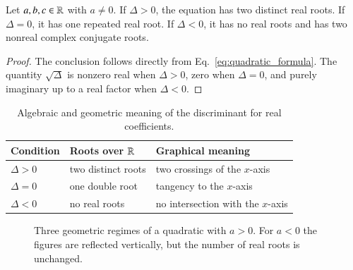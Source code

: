 \begin{proposition}
Let $a,b,c\in\mathbb{R}$ with $a\neq0$.
If $\Delta>0$, the equation has two distinct real roots. If $\Delta=0$, it has one repeated real root. If $\Delta<0$, it has no real roots and has two nonreal complex conjugate roots.
\end{proposition}

\begin{proof}
The conclusion follows directly from Eq.~\eqref{eq:quadratic_formula}. The quantity $\sqrt{\Delta}$ is nonzero real when $\Delta>0$, zero when $\Delta=0$, and purely imaginary up to a real factor when $\Delta<0$.
\end{proof}

\begin{table}[htbp]
\centering
\caption{Algebraic and geometric meaning of the discriminant for real coefficients.}
\begin{tabular}{@{}lll@{}}
\toprule
Condition & Roots over $\mathbb{R}$ & Graphical meaning \\
\midrule
$\Delta>0$ & two distinct roots & two crossings of the $x$-axis \\
$\Delta=0$ & one double root & tangency to the $x$-axis \\
$\Delta<0$ & no real roots & no intersection with the $x$-axis \\
\bottomrule
\end{tabular}
\end{table}

\begin{figure}[htbp]
\centering
{}
\caption{Three geometric regimes of a quadratic with $a>0$. For $a<0$ the figures are reflected vertically, but the number of real roots is unchanged.}
\end{figure}

